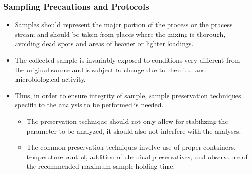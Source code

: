 \subsubsection{Sampling Precautions and Protocols}
			\begin{itemize}
				\item Samples should represent the major portion of the process or the process stream and should be taken from places where the mixing is thorough, avoiding dead spots and areas of heavier or lighter loadings. 
				\item The collected sample is invariably exposed to conditions very different from the original source and is subject to change due to chemical and microbiological activity.  
				\item Thus, in order to ensure integrity of sample, sample preservation techniques specific to the analysis to be performed is needed.  
				      \begin{itemize}
				      	\item The preservation technique should not only allow for stabilizing the parameter to be analyzed, it should also not interfere with the analyses.  
				      	\item The common preservation techniques involve use of proper containers, temperature control, addition of chemical preservatives, and observance of the recommended maximum sample holding time.
				      \end{itemize}
			\end{itemize}

